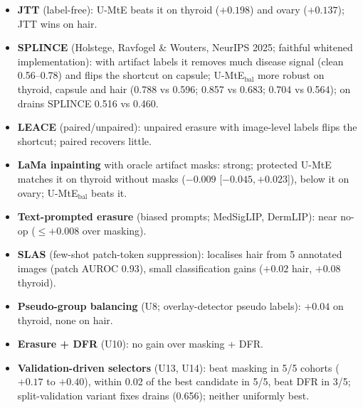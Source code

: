 \documentclass[10pt,a4paper]{article}
\begin{document}
\begin{itemize}[leftmargin=*]\itemsep0pt
\item \textbf{JTT} (label-free): U-MtE beats it on thyroid ($+0.198$) and ovary ($+0.137$); JTT wins on hair.
\item \textbf{SPLINCE} (Holstege, Ravfogel \& Wouters, NeurIPS 2025; faithful whitened implementation): with artifact labels
it removes much disease signal (clean 0.56--0.78) and flips the shortcut on capsule; U-MtE$_{\text{bal}}$ more robust on
thyroid, capsule and hair (0.788 vs 0.596; 0.857 vs 0.683; 0.704 vs 0.564); on drains SPLINCE 0.516 vs 0.460.
\item \textbf{LEACE} (paired/unpaired): unpaired erasure with image-level labels flips the shortcut; paired recovers little.
\item \textbf{LaMa inpainting} with oracle artifact masks: strong; protected U-MtE matches it on thyroid without masks
($-0.009$ [$-0.045,+0.023$]), below it on ovary; U-MtE$_{\text{bal}}$ beats it.
\item \textbf{Text-prompted erasure} (biased prompts; MedSigLIP, DermLIP): near no-op ($\le+0.008$ over masking).
\item \textbf{SLAS} (few-shot patch-token suppression): localises hair from 5 annotated images (patch AUROC 0.93), small
classification gains ($+0.02$ hair, $+0.08$ thyroid).
\item \textbf{Pseudo-group balancing} (U8; overlay-detector pseudo labels): $+0.04$ on thyroid, none on hair.
\item \textbf{Erasure + DFR} (U10): no gain over masking + DFR.
\item \textbf{Validation-driven selectors} (U13, U14): beat masking in 5/5 cohorts ($+0.17$ to $+0.40$), within 0.02 of the
best candidate in 5/5, beat DFR in 3/5; split-validation variant fixes drains (0.656); neither uniformly best.
\end{itemize}
\end{document}
